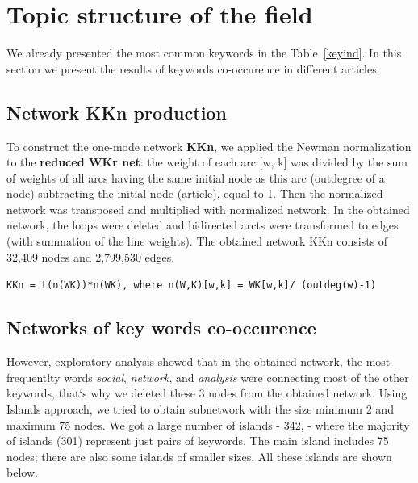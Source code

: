 \documentclass[11pt]{article} %
\begin{document}
\section{Topic structure of the field}  

We already presented the most common keywords in the  Table~\ref{keyind}. In this section we present the results of keywords co-occurence in different articles.  \medskip

\subsection{Network KKn production}

To construct the one-mode network \textbf{KKn}, we applied the Newman normalization  to the \textbf{reduced WKr net}: the weight of each arc [w, k] was divided by the sum of weights of all arcs having the same initial node as this arc (outdegree of a node) subtracting the initial node (article), equal to 1. Then the normalized network was transposed and multiplied with normalized network. In the obtained network, the loops were deleted and bidirected arcts were transformed to edges (with summation of the line weights). The obtained network KKn consists of 32,409 nodes and 2,799,530 edges. \medskip

\texttt{KKn = t(n(WK))*n(WK), where n(W,K)[w,k] = WK[w,k]/ (outdeg(w)-1)} \medskip

\subsection{Networks of key words co-occurence}

However, exploratory analysis showed that in the obtained network, the most frequentlty words \textit{social}, \textit{network}, and \textit{analysis} were connecting most of the other keywords, that`s why we deleted these 3 nodes from the obtained network. Using Islands approach, we tried to obtain subnetwork with the size minimum 2 and maximum 75 nodes. We got a large number of islands - 342, - where the majority of islands (301) represent just pairs of keywords. The main island includes 75 nodes; there are also some islands of smaller sizes. All these islands are shown below.\medskip
\end{document}
